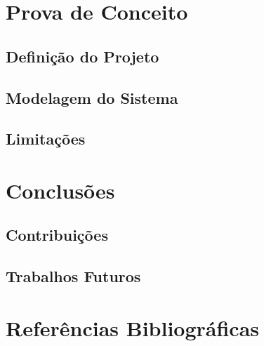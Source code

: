 \documentclass{beamer}
\begin{document}
\section{Prova de Conceito}

\subsection[Definição do Projeto]{Definição do Projeto}

\subsection[Modelagem do Sistema]{Modelagem do Sistema}

\subsection[Limitações]{Limitações}

\section{Conclusões}

\subsection[Contribuições]{Contribuições}

\subsection[Trabalhos Futuros]{Trabalhos Futuros}

\section{Referências Bibliográficas}

\begin{frame}[allowframebreaks]





\end{frame}
\end{document}
